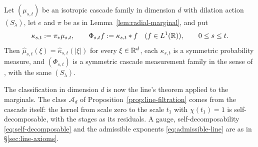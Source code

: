 \begin{lemma}\label{lem:isotropic-marginal-family}
Let $(\mu_{s,t})$ be an isotropic cascade family in dimension $d$ with dilation action
$(S_\lambda)$, let $e$ and $\pi$ be as in Lemma~\ref{lem:radial-marginal}, and put
\[
  \kappa_{s,t} := \pi_*\mu_{s,t}, \qquad \Phi_{s,t}f := \kappa_{s,t} * f
  \quad (f \in L^1(\mathbb{R})), \qquad 0 \le s \le t .
\]
Then $\widehat\mu_{s,t}(\xi) = \widehat\kappa_{s,t}(|\xi|)$ for every $\xi \in \mathbb{R}^d$, each
$\kappa_{s,t}$ is a symmetric probability measure, and $(\Phi_{s,t})$ is a symmetric cascade
measurement family in the sense of , with the same $(S_\lambda)$.
\end{lemma}

The classification in dimension $d$ is now the line's theorem applied to the marginals. The class
$\mathcal{A}_d$ of Proposition~\ref{prop:line-filtration} comes from the cascade itself: the
kernel from scale zero to the scale $t_1$ with $\chi(t_1) = 1$ is self-decomposable, with the
stages as its residuals. A gauge, self-decomposability \ref{eq:self-decomposable} and the
admissible exponents \ref{eq:admissible-line} are as in \S\ref{sec:line-axioms}.

